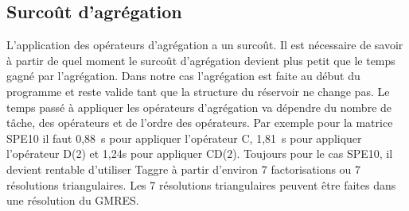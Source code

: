 \subsection{Surcoût d'agrégation}
L'application des opérateurs d'agrégation a un surcoût.
%
Il est nécessaire de savoir à partir de quel moment le surcoût d'agrégation devient plus petit que le temps gagné par l'agrégation.
%
Dans notre cas l'agrégation est faite au début du programme et reste valide tant que la structure du réservoir ne change pas.
%
Le temps passé à appliquer les opérateurs d'agrégation va dépendre du nombre de tâche, des opérateurs et de l'ordre des opérateurs.
%
Par exemple pour la matrice SPE10 il faut 0,88~s pour appliquer l'opérateur C, 1,81~s pour appliquer l'opérateur D(2) et 1,24s pour appliquer CD(2).
%
Toujours pour le cas SPE10, il devient rentable d'utiliser Taggre à partir d'environ 7 factorisations ou 7 résolutions triangulaires.
%
Les 7 résolutions triangulaires peuvent être faites dans une résolution du GMRES.
